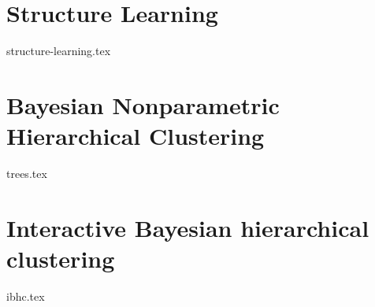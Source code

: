 \chapter{Structure Learning}
\label{chap:structure-learning}
{structure-learning.tex}

\chapter{Bayesian Nonparametric Hierarchical Clustering}
\label{chap:bnhc}
{trees.tex}

\chapter{Interactive Bayesian hierarchical clustering}
\label{chap:ibhc}
{ibhc.tex}
